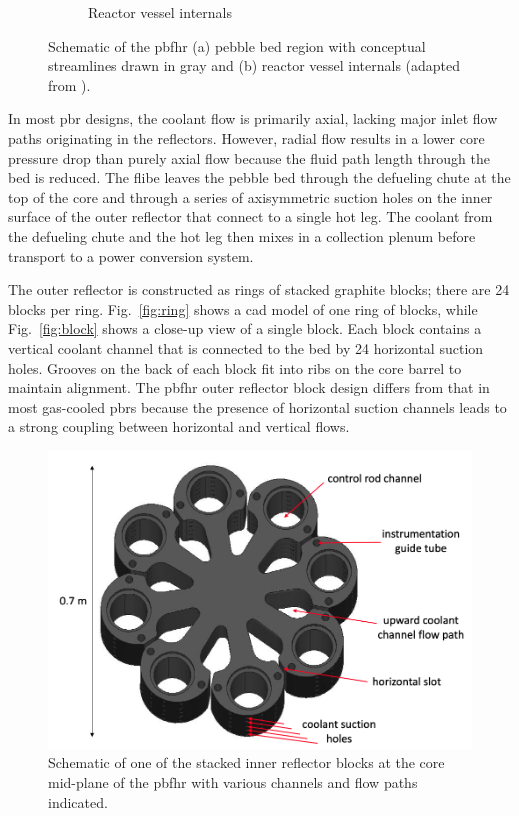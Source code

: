 \begin{figure}[h!]
\begin{subfigure}{0.5\linewidth}
        \caption{Reactor vessel internals}
        \label{fig:pbfhr_core2}
    \end{subfigure}
    \caption{Schematic of the \gls{pbfhr} (a) pebble bed region with conceptual streamlines drawn in gray and (b) reactor vessel internals (adapted from \cite{pbfhr, krumwiede}).}
    \label{fig:pbfhr_big}
\end{figure}

In most \gls{pbr} designs, the coolant flow is primarily axial, lacking major inlet flow paths originating in the reflectors. However, radial flow results in a lower core pressure drop than purely axial flow because the fluid path length through the bed is reduced. The \gls{flibe} leaves the pebble bed through the defueling chute at the top of the core and through a series of axisymmetric suction holes on the inner surface of the outer reflector that connect to a single hot leg. The coolant from the defueling chute and the hot leg then mixes in a collection plenum before transport to a power conversion system.

The outer reflector is constructed as rings of stacked graphite blocks; there are 24 blocks per ring. Fig.\ \ref{fig:ring} shows a \gls{cad} model of one ring of blocks, while Fig.\ \ref{fig:block} shows a close-up view of a single block. Each block contains a vertical coolant channel that is connected to the bed by 24 horizontal suction holes. Grooves on the back of each block fit into ribs on the core barrel to maintain alignment. The \gls{pbfhr} outer reflector block design differs from that in most gas-cooled \glspl{pbr} because the presence of horizontal suction channels leads to a strong coupling between horizontal and vertical flows.

\begin{figure}[h!]
\centering
\hspace{1.1cm}
\includegraphics[width=0.5\linewidth]{figs/center_reflector_labeled.png}
\caption{Schematic of one of the stacked inner reflector blocks at the core mid-plane of the \gls{pbfhr} with various channels and flow paths indicated.}
\label{fig:in}
\end{figure}

